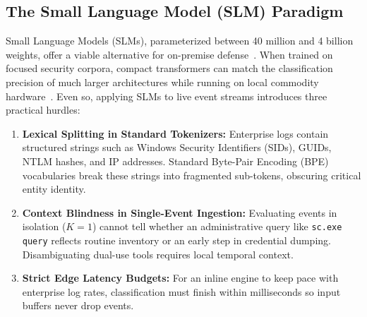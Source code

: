 \documentclass[10pt,journal,compsoc]{IEEEtran}
\begin{document}
\subsection{The Small Language Model (SLM) Paradigm}
Small Language Models (SLMs), parameterized between 40 million and 4 billion weights, offer a viable alternative for on-premise defense~\cite{lu2024survey, tihanyi2025}. When trained on focused security corpora, compact transformers can match the classification precision of much larger architectures while running on local commodity hardware~\cite{upsight2024}. Even so, applying SLMs to live event streams introduces three practical hurdles:
\begin{enumerate}
    \item \textbf{Lexical Splitting in Standard Tokenizers:} Enterprise logs contain structured strings such as Windows Security Identifiers (SIDs), GUIDs, NTLM hashes, and IP addresses. Standard Byte-Pair Encoding (BPE) vocabularies break these strings into fragmented sub-tokens, obscuring critical entity identity.
    \item \textbf{Context Blindness in Single-Event Ingestion:} Evaluating events in isolation ($K=1$) cannot tell whether an administrative query like \texttt{sc.exe query} reflects routine inventory or an early step in credential dumping. Disambiguating dual-use tools requires local temporal context.
    \item \textbf{Strict Edge Latency Budgets:} For an inline engine to keep pace with enterprise log rates, classification must finish within milliseconds so input buffers never drop events.
\end{enumerate}
\end{document}
